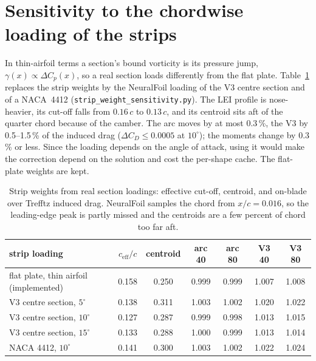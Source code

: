 \documentclass[11pt,a4paper]{article}
\begin{document}
\section{Sensitivity to the chordwise loading of the strips}
\label{app:strips}
In thin-airfoil terms a section's bound vorticity is its pressure jump, $\gamma(x)\propto\Delta C_p(x)$, so a real section loads differently from the flat plate. Table~\ref{tab:strips} replaces the strip weights by the NeuralFoil loading of the V3 centre section and of a NACA~4412 (\texttt{strip\_weight\_sensitivity.py}). The LEI profile is nose-heavier, its cut-off falls from $0.16\,c$ to $0.13\,c$, and its centroid sits aft of the quarter chord because of the camber. The arc moves by at most 0.3\,\%, the V3 by 0.5--1.5\,\% of the induced drag ($\Delta C_D\le0.0005$ at $10^\circ$); the moments change by 0.3\,\% or less. Since the loading depends on the angle of attack, using it would make the correction depend on the solution and cost the per-shape cache. The flat-plate weights are kept.

\begin{table}[h]\centering\small
\caption{Strip weights from real section loadings: effective cut-off, centroid, and on-blade over Trefftz induced drag. NeuralFoil samples the chord from $x/c=0.016$, so the leading-edge peak is partly missed and the centroids are a few percent of chord too far aft.}
\label{tab:strips}
\begin{tabular}{lcccccc}
\toprule
strip loading & $c_{\mathrm{eff}}/c$ & centroid & arc 40 & arc 80 & V3 40 & V3 80\\
\midrule
flat plate, thin airfoil (implemented) & 0.158 & 0.250 & 0.999 & 0.999 & 1.007 & 1.008\\
V3 centre section, $5^\circ$ & 0.138 & 0.311 & 1.003 & 1.002 & 1.020 & 1.022\\
V3 centre section, $10^\circ$ & 0.127 & 0.287 & 0.999 & 0.998 & 1.013 & 1.015\\
V3 centre section, $15^\circ$ & 0.133 & 0.288 & 1.000 & 0.999 & 1.013 & 1.014\\
NACA 4412, $10^\circ$ & 0.141 & 0.300 & 1.003 & 1.002 & 1.022 & 1.024\\
\bottomrule
\end{tabular}
\end{table}
\end{document}
